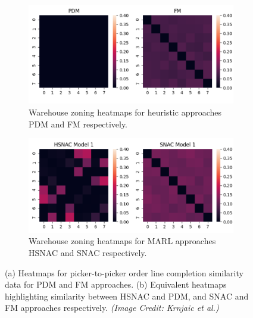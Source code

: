 \documentclass{article}
\begin{document}
\begin{figure}
\centering

\begin{subfigure}[b]{0.55\textwidth}
   \includegraphics[width=1\linewidth]{pdm-fm.png}
   \caption{Warehouse zoning heatmaps for heuristic approaches PDM and FM respectively.}
   \label{fig:pdm-fm}
\end{subfigure}

\begin{subfigure}[b]{0.55\textwidth}
   \includegraphics[width=1\linewidth]{hsnac-snac.png}
   \caption{Warehouse zoning heatmaps for MARL approaches HSNAC and SNAC respectively.}
   \label{fig:hsnac-snac} 
\end{subfigure}


\caption[Warehouse zoning heatmaps]{(a) Heatmaps for picker-to-picker order line completion similarity data for PDM and FM approaches. (b) Equivalent heatmaps highlighting similarity between HSNAC and PDM, and SNAC and FM approaches respectively. \textit{(Image Credit: Krnjaic et al.)}}
\end{figure}
\end{document}

